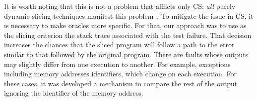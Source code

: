 \documentclass{article}
\begin{document}
It is worth noting that this is not a problem that afflicts only CS;
\emph{all} purely dynamic slicing techniques manifest this
problem~\cite{Lin:2018:BDE:3238147.3238163}. To mitigate the issue in
CS, it is necessary to make oracles more specific. For that, our
approach was to use as the slicing criterion the stack trace
associated with the test failure. That decision increases the chances
that the sliced program will follow a path to the error similar to
that followed by the original program.
There are faults whose outputs
may slightly differ from one execution to another. For example,
exceptions including memory addresses identifiers, which change on
each execution. For these cases, it was developed a mechanism to compare the
rest of the output ignoring the identifier of the memory address.


\end{document}
